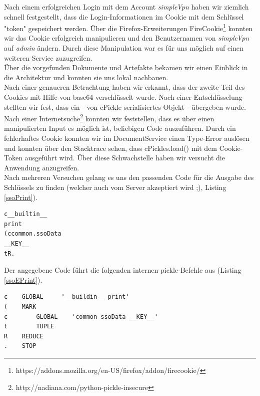 \documentclass[12pt]{article}
\begin{document}
Nach einem erfolgreichen Login mit dem Account \emph{simpleVpn} haben wir ziemlich schnell festgestellt, dass die Login-Informationen im Cookie mit dem Schlüssel "token" gespeichert werden. Über die Firefox-Erweiterungen FireCookie\footnote{https://addons.mozilla.org/en-US/firefox/addon/firecookie/} konnten wir das Cookie erfolgreich manipulieren und den Benutzernamen von \emph{simpleVpn} auf \emph{admin} ändern. Durch diese Manipulation war es für uns möglich auf einen weiteren Service zuzugreifen. \\
Über die vorgefunden Dokumente und Artefakte bekamen wir einen Einblick in die Architektur und konnten sie uns lokal nachbauen. \\
Nach einer genaueren Betrachtung haben wir erkannt, dass der zweite Teil des Cookies mit Hilfe von base64 verschlüsselt wurde. Nach einer Entschlüsselung stellten wir fest, dass ein - von cPickle serialisiertes Objekt - übergeben wurde. Nach einer Internetsuche\footnote{http://nadiana.com/python-pickle-insecure} konnten wir feststellen, dass es über einen manipulierten Input es möglich ist, beliebigen Code auszuführen. Durch ein fehlerhaftes Cookie konnten wir im DocumentService einen Type-Error auslösen und konnten über den Stacktrace sehen, dass cPickles.load() mit dem Cookie-Token ausgeführt wird. Über diese Schwachstelle haben wir versucht die Anwendung anzugreifen.\\
Nach mehreren Versuchen gelang es uns den passenden Code für die Ausgabe des Schlüssels zu finden (welcher auch vom Server akzeptiert wird ;), Listing \ref{ssoPrint}). 
\begin{lstlisting}[caption={Ausgabe von \_\_KEY\_\_ mit Hilfe von print},label=ssoPrint]
c__builtin__
print
(ccommon.ssoData
__KEY__
tR.
\end{lstlisting}



Der angegebene Code führt die folgenden internen pickle-Befehle aus (Listing \ref{ssoEPrint}). 
\begin{lstlisting}[caption={Erklärung des pickle-Codes},label=ssoEPrint]
c    GLOBAL     '__buildin__ print'
(    MARK
c        GLOBAL    'common ssoData __KEY__'
t        TUPLE      
R    REDUCE
.    STOP
\end{lstlisting}
\end{document}

